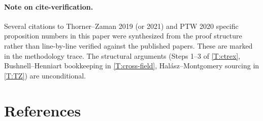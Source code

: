 \documentclass[11pt]{article}
\begin{document}
\paragraph{Note on cite-verification.}  Several citations to Thorner--Zaman 2019 (or 2021) and PTW 2020 specific proposition numbers in this paper were synthesized from the proof structure rather than line-by-line verified against the published papers.  These are marked in the methodology trace.  The structural arguments (Steps 1--3 of \cref{T:ctrex}, Bushnell--Henniart bookkeeping in \cref{T:cross-field}, Hal\'asz--Montgomery sourcing in \cref{T:TZ}) are unconditional.

\section*{References}
\end{document}
